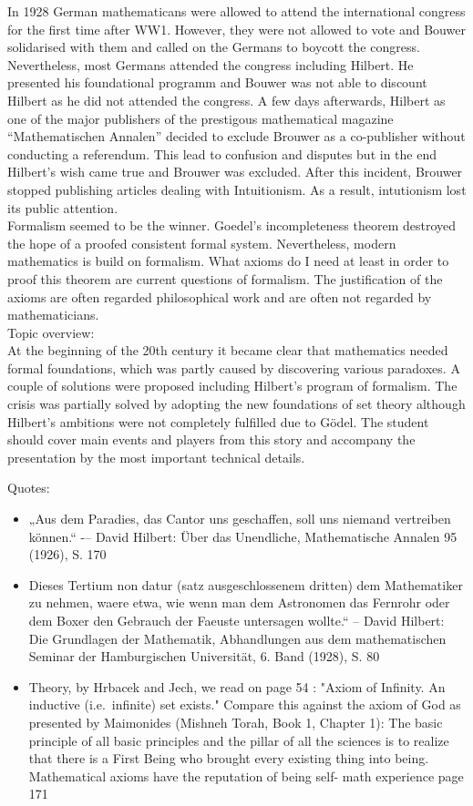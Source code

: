 \documentclass[hidelinks]{article}
\theoremstyle{plain}
\theoremstyle{definition}
\theoremstyle{rem}
\begin{document}
In 1928 German mathematicans were allowed to attend the international congress for the first time after WW1. However, they were not allowed to vote and Bouwer solidarised with them and called on the Germans to boycott the congress. Nevertheless, most Germans attended the congress including Hilbert. He presented his foundational programm and Bouwer was not able to discount Hilbert as he did not attended the congress. A few days afterwards, Hilbert as one of the major publishers of the prestigous mathematical magazine ``Mathematischen Annalen'' decided to exclude Brouwer as a co-publisher without conducting a referendum. This lead to confusion and disputes but in the end Hilbert's wish came true and Brouwer was excluded. After this incident, Brouwer stopped publishing articles dealing with Intuitionism. As a result, intutionism lost its public attention. \\

Formalism seemed to be the winner. Goedel's incompleteness theorem destroyed the hope of a proofed consistent formal system. Nevertheless, modern mathematics is build on formalism. What axioms do I need at least in order to proof this theorem are current questions of formalism. The justification of the axioms are often regarded philosophical work and are often not regarded by mathematicians.
\\

Topic overview:\\
At the beginning of the 20th century it became clear that mathematics needed formal foundations, which was partly caused by discovering various paradoxes. A couple of solutions were proposed including Hilbert's program of formalism. The crisis was partially solved by adopting the new foundations of set theory although Hilbert's ambitions were not completely fulfilled due to Gödel. The student should cover main events and players from this story and accompany the presentation by the most important technical details.



Quotes: 
\begin{itemize}
\item „Aus dem Paradies, das Cantor uns geschaffen, soll uns niemand vertreiben können.“ -– David Hilbert: Über das Unendliche, Mathematische Annalen 95 (1926), S. 170 
\item Dieses Tertium non datur (satz ausgeschlossenem dritten) dem Mathematiker zu nehmen, waere etwa, wie wenn man dem Astronomen das Fernrohr oder dem Boxer den Gebrauch der Faeuste untersagen wollte.“ – David Hilbert: Die Grundlagen der Mathematik, Abhandlungen aus dem mathematischen Seminar der Hamburgischen Universität, 6. Band (1928), S. 80
\item Theory, by Hrbacek and Jech, we read on page 54 :
	"Axiom of Infinity. An inductive (i.e.\ infinite) set exists." Compare this against the axiom of God as presented by Maimonides (Mishneh Torah, Book 1, Chapter 1): The basic principle of all basic principles and the pillar of all the sciences is to realize that there is a First Being who brought every existing thing into being.  Mathematical axioms have the reputation of being self- math experience page 171
\end{itemize}

\newpage


\end{document}
